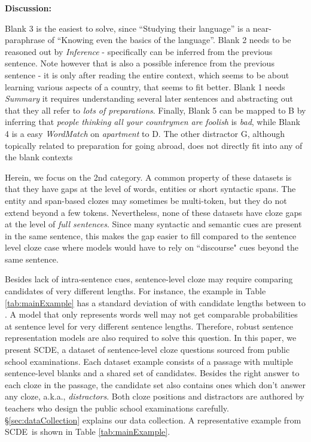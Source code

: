 \documentclass[11pt,a4paper]{article}
\newcommand{\dsname}{\textsc{SCDE}}
\begin{document}
\begin{table*}[!ht]
{\begin{minipage}[t]{445pt}
{{\bf Discussion:}

Blank 3 is the easiest to solve, since ``Studying their language'' is a near-paraphrase of ``Knowing even the basics of the language''. Blank 2 needs to be reasoned out by \textit{Inference} - specifically  can be inferred from the previous sentence. Note however that  is also a possible inference from the previous sentence - it is only after reading the entire context, which seems to be about learning various aspects of a country, that  seems to fit better. Blank 1 needs \textit{Summary}  it requires understanding several later sentences and abstracting out that they all refer to \emph{lots of preparations}. Finally, Blank 5 can be mapped to B by inferring that \textit{people thinking all your countrymen are foolish} is \emph{bad}, while Blank 4 is a easy \textit{WordMatch} on \textit{apartment} to D. The other distractor G, although topically related to preparation for going abroad, does not directly fit into any of the blank contexts
}
\end{minipage}}
\caption{A Representative Example from \dsname.}
\label{tab:mainExample}
\vspace{-2ex}
\end{table*}



Herein, we focus on the 2nd category. A common property of these datasets is that they have gaps at the level of words, entities or short syntactic spans. The entity and span-based clozes may sometimes be multi-token, but they do not extend beyond a few tokens. Nevertheless, none of these datasets have cloze gaps at the level of \emph{full sentences}. Since many syntactic and semantic cues are present in the same sentence, this makes the gap easier to fill compared to the sentence level cloze case where models would have to rely on ``discourse" cues beyond the same sentence. 


Besides lack of intra-sentence cues, sentence-level cloze may require comparing candidates of very different lengths. For instance, the example in Table \ref{tab:mainExample} has a standard deviation of  with candidate lengths between  to . A model that only represents words well may not get comparable probabilities at sentence level for very different sentence lengths. Therefore, robust sentence representation models are also required to solve this question. 
In this paper, we present \dsname, a dataset of sentence-level cloze questions sourced from public school examinations. Each dataset example consists of a passage with multiple sentence-level blanks and a shared set of candidates. Besides the right answer to each cloze in the passage, the candidate set also contains ones which don't answer any cloze, a.k.a., \emph{distractors}. Both cloze positions and distractors are authored by teachers who design the public school examinations carefully. \S \ref{sec:dataCollection} explains our data collection. A representative example from \dsname~is shown in Table \ref{tab:mainExample}. 
\end{document}
